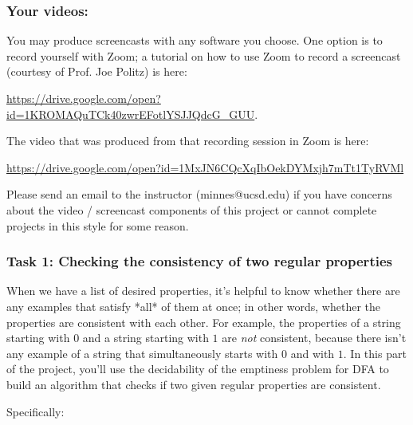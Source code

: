 \documentclass[12pt, oneside]{article}
\begin{document}
\newpage
\subsubsection*{Your videos:} You may produce screencasts 
with any software you choose. 
One option is to record yourself with Zoom; a tutorial on how to use 
Zoom to record a 
screencast (courtesy of Prof. Joe Politz)  is here: 

\url{https://drive.google.com/open?id=1KROMAQuTCk40zwrEFotlYSJJQdcG_GUU}.

The video that was produced from that recording session in Zoom is here:

\url{https://drive.google.com/open?id=1MxJN6CQcXqIbOekDYMxjh7mTt1TyRVMl}

Please send an email to the instructor 
(minnes@ucsd.edu) if you have 
concerns about  the video / screencast components of this project or 
cannot complete projects in this style for some reason.

\vspace{-20pt}

\subsubsection*{Task 1: Checking the consistency of two regular properties}

When we have a list of desired properties, it's helpful to know whether there 
are any examples that satisfy *all* of them at once; 
in other words, whether the  properties are 
consistent with each other. For example, the properties of 
a string starting with $0$ and a string starting with $1$ are {\it not} consistent, 
because there isn't any example of a string that simultaneously starts with $0$ and with $1$.
In this part of the 
project, you'll use the decidability of the emptiness problem for DFA to 
build an algorithm that checks if two given regular properties are consistent.

Specifically:

\vspace{-20pt}
\end{document}
